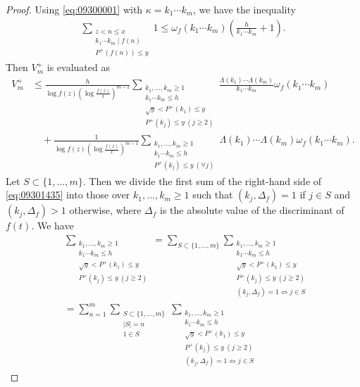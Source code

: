 \documentclass[a4paper,11pt]{amsart}
\theoremstyle{definition}
\numberwithin{equation}{section}
\begin{document}
\begin{proof}
Using \eqref{eq:09300001} with $\kappa=k_1 \cdots k_m$, we have the inequality
\begin{align*}
\sum_{\substack{z<n \leq x \\ k_1 \cdots k_m \mid f(n) \\ P^+(f(n)) \leq y}} 1
\leq \omega_f(k_1 \cdots k_m) \left(\frac{h}{k_1 \cdots k_m}+1\right). 
\end{align*}
Then $V_m^+$ is evaluated as
\begin{align}\label{eq:09301435}
V_m^+
&\leq \frac{h}{\log{f(z)} \left(\log{\frac{f(z)}{x}}\right)^{m-1}} 
\sum_{\substack{k_1,\ldots,k_m \geq 1 \\ k_1 \cdots k_m \leq h \\ \sqrt{y} < P^+(k_1) \leq y \\ P^+(k_j) \leq y ~(j \geq 2)}} 
\frac{\Lambda(k_1) \cdots \Lambda(k_m)}{k_1 \cdots k_m} \omega_f(k_1 \cdots k_m) \\
&\quad 
+ \frac{1}{\log{f(z)} \left(\log{\frac{f(z)}{x}}\right)^{m-1}} 
\sum_{\substack{k_1,\ldots,k_m \geq 1 \\ k_1 \cdots k_m \leq h \\ P^+(k_j) \leq y ~(\forall j)}} 
\Lambda(k_1) \cdots \Lambda(k_m) \omega_f(k_1 \cdots k_m). \nonumber
\end{align}
Let $S \subset \{1,\ldots,m\}$. 
Then we divide the first sum of the right-hand side of \eqref{eq:09301435} into those over $k_1, \ldots, k_m \geq1$ such that $(k_j,\Delta_f)=1$ if $j \in S$ and $(k_j,\Delta_f)>1$ otherwise, where $\Delta_f$ is the absolute value of the discriminant of $f(t)$. 
We have
\begin{align}\label{eq:09301334}
&\sum_{\substack{k_1,\ldots,k_m \geq 1 \\ k_1 \cdots k_m \leq h \\ \sqrt{y} < P^+(k_1) \leq y \\ P^+(k_j) \leq y ~(j \geq 2)}} 
= \sum_{S \subset \{1, \ldots, m\}}
\sum_{\substack{k_1,\ldots,k_m \geq 1 \\ k_1 \cdots k_m \leq h \\ \sqrt{y} < P^+(k_1) \leq y \\ P^+(k_j) \leq y ~(j \geq 2) \\ (k_j,\Delta_f)=1 \Leftrightarrow j \in S}} \\
&= \sum_{n=1}^{m} \sum_{\substack{S \subset \{1, \ldots, m\} \\ |S|=n \\ 1 \in S}}
\sum_{\substack{k_1,\ldots,k_m \geq 1 \\ k_1 \cdots k_m \leq h \\ \sqrt{y} < P^+(k_1) \leq y  \\ P^+(k_j) \leq y ~(j \geq 2) \\ (k_j,\Delta_f)=1 \Leftrightarrow j \in S}} 

\end{align}
\end{proof}
\end{document}
